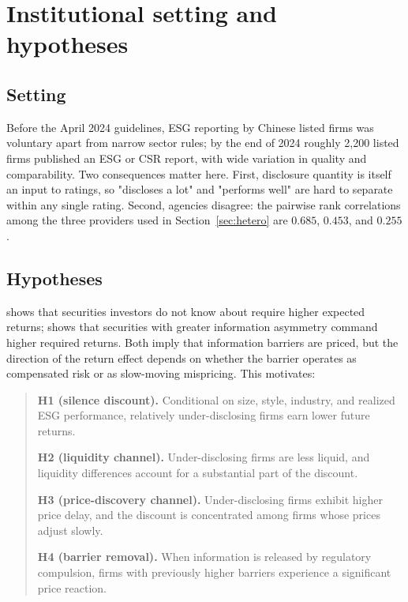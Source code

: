 \documentclass[12pt]{article}
\begin{document}
\section{Institutional setting and hypotheses}

\subsection{Setting}
Before the April 2024 guidelines, ESG reporting by Chinese listed firms was
voluntary apart from narrow sector rules; by the end of 2024 roughly 2{,}200
listed firms published an ESG or CSR report, with wide variation in quality and
comparability. Two consequences matter here. First, disclosure quantity is
itself an input to ratings, so "discloses a lot" and "performs well" are hard
to separate within any single rating. Second, agencies disagree: the pairwise
rank correlations among the three providers used in Section~\ref{sec:hetero}
are $0.685$, $0.453$, and $0.255$.

\subsection{Hypotheses}
\citet{merton1987} shows that securities investors do not know about require
higher expected returns; \citet{easley2004} shows that securities with greater
information asymmetry command higher required returns. Both imply that
information barriers are priced, but the direction of the return effect depends
on whether the barrier operates as compensated risk or as slow-moving
mispricing. This motivates:

\begin{quote}
\noindent\textbf{H1 (silence discount).} Conditional on size, style, industry,
and realized ESG performance, relatively under-disclosing firms earn lower
future returns.

\noindent\textbf{H2 (liquidity channel).} Under-disclosing firms are less
liquid, and liquidity differences account for a substantial part of the
discount.

\noindent\textbf{H3 (price-discovery channel).} Under-disclosing firms exhibit
higher price delay, and the discount is concentrated among firms whose prices
adjust slowly.

\noindent\textbf{H4 (barrier removal).} When information is released by
regulatory compulsion, firms with previously higher barriers experience a
significant price reaction.
\end{quote}
\end{document}
